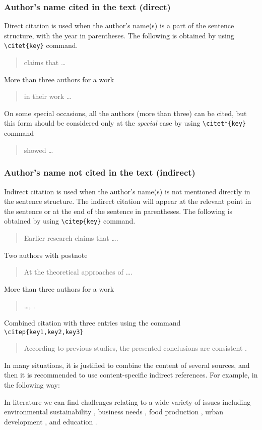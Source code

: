 \subsubsection*{Author's name cited in the text (direct)}
Direct citation is used when the author’s name(s) is a part of the sentence structure, with the year in parentheses. The following is obtained by using \verb+\citet{key}+ command.
\begin{quote}
\citet{All87} claims that \ldots
\end{quote}
More than three authors for a work
\begin{quote}
\citet{CHOWDHURY} in their work \ldots
\end{quote}
On some special occasions, all the authors (more than three) can be cited, but this form should be considered only at the \emph{special} case by using \verb+\citet*{key}+ command
\begin{quote}
\citet*{Biz98} showed \ldots
\end{quote}

\subsubsection*{Author's name not cited in the text (indirect)}
Indirect citation is used when the author's name(s) is not mentioned directly in the sentence structure. The indirect citation will appear at the relevant point in the sentence or at the end of the sentence in parentheses. The following is obtained by using \verb+\citep{key}+ command.

\begin{quote}
Earlier research claims that \ldots \citep{Sav92}.
\end{quote}
Two authors with postnote
\begin{quote}
At the theoretical approaches of \ldots \citep[102]{All87}.
\end{quote}
More than three authors for a work
\begin{quote}
\ldots, \citep{VELEVA}.
\end{quote}
Combined citation with three entries using the command \verb+\citep{key1,key2,key3}+
\begin{quote}
According to previous studies, the presented conclusions are consistent \citep{Mil97,Dal05,All87}.
\end{quote}

In many situations, it is justified to combine the content of several sources, and then it is recommended to use content-specific indirect references. For example, in the following way:
\begin{displayquote}
In literature we can find challenges relating to a wide variety of issues including environmental sustainability \citep{DAGILIUTE}, business needs \citep{VELEVA}, food production \citep{CHOWDHURY}, urban development \citep{Joss,swapan,freeman,WAITE}, and education \citep{ZIDANSEK,Biberhofer}.
\end{displayquote}

